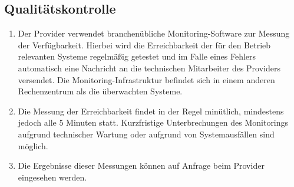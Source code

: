 \documentclass{terms}
\begin{document}
\subsection{Qualitätskontrolle}
\begin{enumerate}
\item Der Provider verwendet branchenübliche Monitoring-Software zur Messung der Verfügbarkeit. Hierbei wird die Erreichbarkeit der für den Betrieb relevanten Systeme regelmäßig getestet und im Falle eines Fehlers automatisch eine Nachricht an die technischen Mitarbeiter des Providers versendet. Die Monitoring-Infrastruktur befindet sich in einem anderen Rechenzentrum als die überwachten Systeme.
\item Die Messung der Erreichbarkeit findet in der Regel minütlich, mindestens jedoch alle 5 Minuten statt. Kurzfristige Unterbrechungen des Monitorings aufgrund technischer Wartung oder aufgrund von Systemausfällen sind möglich.
\item Die Ergebnisse dieser Messungen können auf Anfrage beim Provider eingesehen werden.
\end{enumerate}
\end{document}
